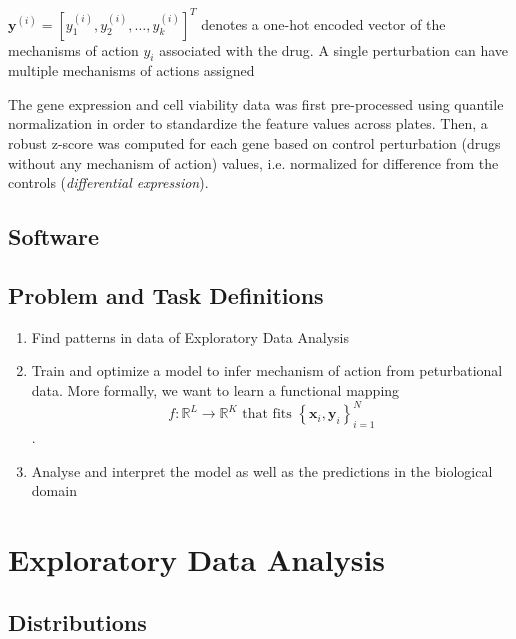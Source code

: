 \documentclass[bsc,frontabs,twoside,singlespacing,parskip,deptreport]{infthesis}     %
\begin{document}
\(\mathbf{y}^{(i)}=[y_{1}^{(i)},y_{2}^{(i)},\ldots, y_{k}^{(i)}]^{T}\) denotes a one-hot encoded vector of the mechanisms of action \(y_{i}\) associated with the drug. A single perturbation can have multiple mechanisms of actions assigned


The gene expression and cell viability data was first pre-processed using quantile normalization in order to standardize the feature values across plates. Then, a robust z-score was computed for each gene based on control perturbation (drugs without any mechanism of action) values, i.e. normalized for difference from the controls (\textit{differential expression}).

\subsection{Software}

\subsection{Problem and Task Definitions}
\begin{enumerate}
    \item Find patterns in data of Exploratory Data Analysis
    \item Train and optimize a model to infer mechanism of action from peturbational data. More formally, we want to learn a functional mapping \[f: \mathbb{R}^{L} \rightarrow \mathbb{R}^{K} \text { that fits }\left\{\mathbf{x}_{i}, \mathbf{y}_{i}\right\}_{i=1}^{N}\].
    \item Analyse and interpret the model as well as the predictions in the biological domain 
\end{enumerate}



\section{Exploratory Data Analysis}
\subsection{Distributions}\label{data distribution}
\end{document}

